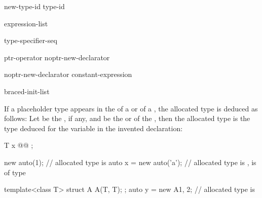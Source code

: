 \begin{bnf}
\br
    \opt{\terminal{::}}   new-type-id  \br
    \opt{\terminal{::}}   \terminal{(} type-id \terminal{)} 
\end{bnf}

%
%
\begin{bnf}
\br
    \terminal{(} expression-list \terminal{)}
\end{bnf}

\begin{bnf}
\br
    type-specifier-seq 
\end{bnf}

\begin{bnf}
\br
    ptr-operator  \br
    noptr-new-declarator
\end{bnf}

\begin{bnf}
\br
    \terminal{[}  \terminal{]} \br
    noptr-new-declarator \terminal{[} constant-expression \terminal{]} 
\end{bnf}

\begin{bnf}
\br
    \terminal{(}  \terminal{)}\br
    braced-init-list
\end{bnf}

\pnum
If a placeholder type appears in the
 of a  or
 of a ,
the allocated type is deduced as follows:
Let
 be the , if any,
and
 be the  or  of
the , then the allocated type is the type
deduced for the variable  in the invented
declaration:

\begin{codeblock}
T x @\textrm{}@ ;
\end{codeblock}

\begin{example}
\begin{codeblock}
new auto(1);                    // allocated type is 
auto x = new auto('a');         // allocated type is ,  is of type 

template<class T> struct A { A(T, T); };
auto y = new A{1, 2};           // allocated type is 
\end{codeblock}
\end{example}

